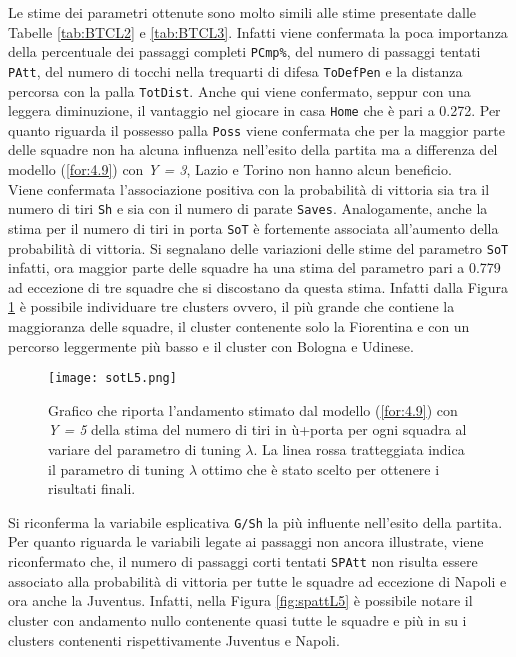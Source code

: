 Le stime dei parametri ottenute sono molto simili alle stime presentate dalle Tabelle \ref{tab:BTCL2} e \ref{tab:BTCL3}. Infatti viene confermata la poca importanza della percentuale dei passaggi completi \texttt{PCmp\%}, del numero di passaggi tentati \texttt{PAtt}, del numero di tocchi nella trequarti di difesa \texttt{ToDefPen} e la distanza percorsa con la palla \texttt{TotDist}.
Anche qui viene confermato, seppur con una leggera diminuzione, il vantaggio nel giocare in casa \texttt{Home} che è pari a 0.272.
Per quanto riguarda il possesso palla \texttt{Poss} viene confermata che per la maggior parte delle squadre non ha alcuna influenza nell'esito della partita ma a differenza del modello (\ref{for:4.9}) con \emph{Y = 3}, Lazio e Torino non hanno alcun beneficio.\\
Viene confermata l'associazione positiva con la probabilità di vittoria sia tra il numero di tiri \texttt{Sh} e sia con il numero di parate \texttt{Saves}. Analogamente, anche la stima per il numero di tiri in porta \texttt{SoT} è fortemente associata all'aumento della probabilità di vittoria. Si segnalano delle variazioni delle stime del parametro \texttt{SoT} infatti, ora maggior parte delle squadre ha una stima del parametro pari a 0.779 ad eccezione di tre squadre che si discostano da questa stima. Infatti dalla Figura \ref{fig:sotL5} è possibile individuare tre clusters ovvero, il più grande che contiene la maggioranza delle squadre, il cluster contenente solo la Fiorentina e con un percorso leggermente più basso e il cluster con Bologna e Udinese.
\begin{figure}[htbp]
	\begin{center}
		\texttt{[image: sotL5.png]}
		\caption{Grafico che riporta l'andamento stimato dal modello (\ref{for:4.9}) con \emph{Y = 5} della stima del numero di tiri in ù+porta per ogni squadra al variare del parametro di tuning $\lambda$. La linea rossa tratteggiata indica il parametro di tuning $\lambda$ ottimo che è stato scelto per ottenere i risultati finali.} \label{fig:sotL5}
	\end{center}
\end{figure}
Si riconferma la variabile esplicativa \texttt{G/Sh} la più influente nell'esito della partita.\\
Per quanto riguarda le variabili legate ai passaggi non ancora illustrate, viene riconfermato che, il numero di passaggi corti tentati \texttt{SPAtt} non risulta essere associato alla probabilità di vittoria per tutte le squadre ad eccezione di Napoli e ora anche la Juventus. Infatti, nella Figura \ref{fig:spattL5} è possibile notare il cluster con andamento nullo contenente quasi tutte le squadre e più in su i clusters contenenti rispettivamente Juventus e Napoli.
